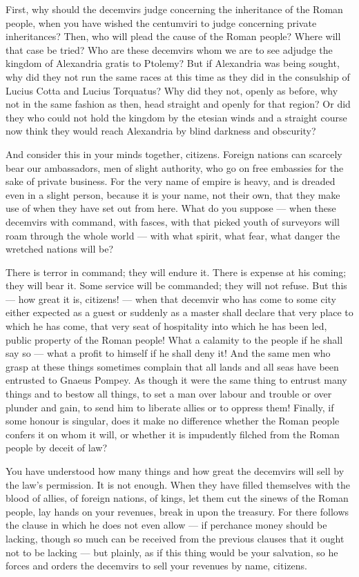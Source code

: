 First, why should the decemvirs judge concerning the inheritance of the Roman people, when you have wished the centumviri to judge concerning private inheritances? Then, who will plead the cause of the Roman people? Where will that case be tried? Who are these decemvirs whom we are to see adjudge the kingdom of Alexandria gratis to Ptolemy? But if Alexandria was being sought, why did they not run the same races at this time as they did in the consulship of Lucius Cotta and Lucius Torquatus? Why did they not, openly as before, why not in the same fashion as then, head straight and openly for that region? Or did they who could not hold the kingdom by the etesian winds and a straight course now think they would reach Alexandria by blind darkness and obscurity?

 And consider this in your minds together, citizens. Foreign nations can scarcely bear our ambassadors, men of slight authority, who go on free embassies for the sake of private business. For the very name of empire is heavy, and is dreaded even in a slight person, because it is your name, not their own, that they make use of when they have set out from here. What do you suppose --- when these decemvirs with command, with fasces, with that picked youth of surveyors will roam through the whole world --- with what spirit, what fear, what danger the wretched nations will be?

 There is terror in command; they will endure it. There is expense at his coming; they will bear it. Some service will be commanded; they will not refuse. But this --- how great it is, citizens! --- when that decemvir who has come to some city either expected as a guest or suddenly as a master shall declare that very place to which he has come, that very seat of hospitality into which he has been led, public property of the Roman people! What a calamity to the people if he shall say so --- what a profit to himself if he shall deny it! And the same men who grasp at these things sometimes complain that all lands and all seas have been entrusted to Gnaeus Pompey. As though it were the same thing to entrust many things and to bestow all things, to set a man over labour and trouble or over plunder and gain, to send him to liberate allies or to oppress them! Finally, if some honour is singular, does it make no difference whether the Roman people confers it on whom it will, or whether it is impudently filched from the Roman people by deceit of law?

 You have understood how many things and how great the decemvirs will sell by the law's permission. It is not enough. When they have filled themselves with the blood of allies, of foreign nations, of kings, let them cut the sinews of the Roman people, lay hands on your revenues, break in upon the treasury. For there follows the clause in which he does not even allow --- if perchance money should be lacking, though so much can be received from the previous clauses that it ought not to be lacking --- but plainly, as if this thing would be your salvation, so he forces and orders the decemvirs to sell your revenues by name, citizens.

